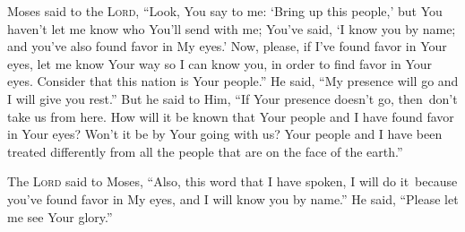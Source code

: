 \begin{inparaenum}
     Moses said to the \textsc{Lord}, ``Look, You say to me: `Bring up this people,' but You haven't let me know who You'll send with me; You've said, `I know you by name; and you've also found favor in My eyes.'%
     Now, please, if I've found favor in Your eyes, let me know Your way so I can know you, in order to find favor in Your eyes. Consider that this nation is Your people.''%
     He said, ``My presence will go and I will give you rest.''%
     But he said to Him, ``If Your presence doesn't go, then\understood\ don't take us from here.%
     How will it be known that Your people and I have found favor in Your eyes? Won't it be by Your going with us? Your people and I have been treated differently from all the people that are on the face of the earth.''%
    
     The \textsc{Lord} said to Moses, ``Also, this word that I have spoken, I will do it\understood\ because you've found favor in My eyes, and I will know you by name.''%
     He said, ``Please let me see Your glory.''%
\end{inparaenum}
